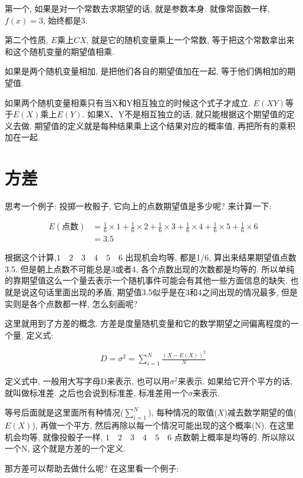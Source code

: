 第一个, 如果是对一个常数去求期望的话, 就是参数本身. 就像常函数一样, $f(x) = 3$, 始终都是3. 

第二个性质, $E$乘上$CX$, 就是它的随机变量乘上一个常数, 等于把这个常数拿出来和这个随机变量的期望值相乘. 

如果是两个随机变量相加, 是把他们各自的期望值加在一起, 等于他们俩相加的期望值. 

如果两个随机变量相乘只有当X和Y相互独立的时候这个式子才成立. $E(XY)$等于$E(X)$乘上$E(Y)$. 如果X、Y不是相互独立的话, 就只能根据这个期望值的定义去做. 期望值的定义就是每种结果乘上这个结果对应的概率值, 再把所有的乘积加在一起. 

\section{方差}

思考一个例子: 投掷一枚骰子, 它向上的点数期望值是多少呢? 来计算一下:

\begin{align*}
  E(\mbox{点数}) & = \frac{1}{6} \times 1 + \frac{1}{6} \times 2 + \frac{1}{6} \times 3 + \frac{1}{6} \times 4 + \frac{1}{6} \times 5 + \frac{1}{6} \times 6 \\
  & = 3.5
\end{align*}

根据这个计算,$1 \quad 2 \quad 3 \quad 4 \quad 5 \quad 6$ 出现机会均等, 都是1/6, 算出来结果期望值点数3.5. 但是朝上点数不可能总是3或者4, 各个点数出现的次数都是均等的. 所以单纯的靠期望值这么一个量去表示一个随机事件可能会有其他一些方面信息的缺失. 也就是说这句话里面出现的矛盾, 期望值3.5似乎是在3和4之间出现的情况最多, 但是实则是各个点数都一样, 怎么刻画呢? 

这里就用到了方差的概念. 方差是度量随机变量和它的数学期望之间偏离程度的一个量. 定义式: 

\begin{align*}
  D = \sigma ^2 = \sum^N_{i=1} \frac{(X-E(X))^2}{N}
\end{align*}

定义式中, 一般用大写字母D来表示, 也可以用$\sigma^2$来表示. 如果给它开个平方的话, 就叫做标准差. 之后也会说到标准差, 标准差用一个$\sigma$来表示. 

等号后面就是这里面所有种情况($\sum_{i=1}^N$), 每种情况的取值($X$)减去数学期望的值($E(X)$), 再做一个平方, 然后再除以每一个情况可能出现的这个概率(N). 在这里机会均等, 就像投骰子一样, $1 \quad 2 \quad 3 \quad 4 \quad 5 \quad 6$ 点数朝上概率是均等的. 所以除以一个N, 这个就是方差的一个定义. 

那方差可以帮助去做什么呢? 在这里看一个例子:

